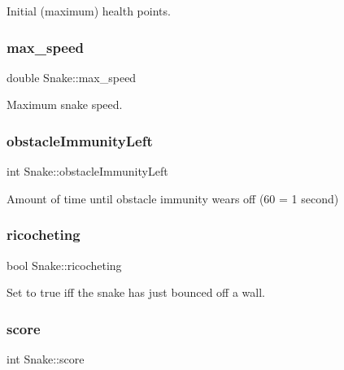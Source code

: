 Initial (maximum) health points. 

\mbox{\label{group__snake_ga52857dbba7b74ca5c06b9b872cc1fb67}} 
\subsubsection{\texorpdfstring{max\+\_\+speed}{max\_speed}}
{\footnotesize\ttfamily double Snake\+::max\+\_\+speed}



Maximum snake speed. 

\mbox{\label{group__snake_ga7296bc0cf6f2410a20eb48fda726a8f6}} 
\subsubsection{\texorpdfstring{obstacle\+Immunity\+Left}{obstacleImmunityLeft}}
{\footnotesize\ttfamily int Snake\+::obstacle\+Immunity\+Left}



Amount of time until obstacle immunity wears off (60 = 1 second) 

\mbox{\label{group__snake_ga7fa12626da8070f765499c9dae661271}} 
\subsubsection{\texorpdfstring{ricocheting}{ricocheting}}
{\footnotesize\ttfamily bool Snake\+::ricocheting}



Set to true iff the snake has just bounced off a wall. 

\mbox{\label{group__snake_gae5b13aadb0092ce8c45e04de9024444f}} 
\subsubsection{\texorpdfstring{score}{score}}
{\footnotesize\ttfamily int Snake\+::score}



